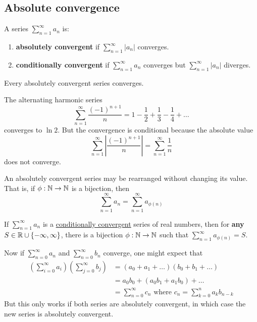 \documentclass[12pt]{article}
\begin{document}
\subsection{Absolute convergence}

 A series $\sum_{n=1}^{\infty}a_n$ is:\begin{enumerate}
    \item \textbf{absolutely convergent} if $\sum_{n=1}^{\infty}|a_n|$ converges.
    \item \textbf{conditionally convergent} if $\sum_{n=1}^{\infty}a_n$ converges but $\sum_{n=1}^{\infty}|a_n|$ diverges.
\end{enumerate}

\begin{theorem}
    Every absolutely convergent series converges.
\end{theorem}
\eg The alternating harmonic series $$\sum_{n=1}^{\infty}\frac{(-1)^{n+1}}{n}=1-\frac{1}{2}+\frac{1}{3}-\frac{1}{4}+\dots$$ converges to $\ln 2$. But the convergence is conditional because the absolute value $$\sum_{n=1}^{\infty}\left|\frac{(-1)^{n+1}}{n}\right|=\sum_{n=1}^{\infty}\frac{1}{n}$$ does not converge.

\begin{theorem}
    An absolutely convergent series may be rearranged without changing its value. That is, if $\phi:\mathbb{N}\to \mathbb{N}$ is a bijection, then $$\sum_{n=1}^{\infty}a_n=\sum_{n=1}^{\infty}a_{\phi(n)}$$
\end{theorem}

\begin{theorem}
    If $\sum_{n=1}^{\infty}a_n$ is a \uline{conditionally convergent} series of real numbers, then for \textbf{any} $S\in \mathbb{R}\cup \{-\infty,\infty\}$, there is a bijection $\phi:\mathbb{N}\to\mathbb{N}$ such that $\sum_{n=1}^{\infty}a_{\phi(n)}=S$.
\end{theorem}

\spl

Now if $\sum_{n=0}^{\infty}a_n$ and $\sum_{n=0}^{\infty}b_n$ converge, one might expect that \begin{align*}
    \left(\sum_{i=0}^{\infty}a_i\right)\left(\sum_{j=0}^{\infty}b_j\right)&=(a_0+a_1+\dots)(b_0+b_1+\dots)\\
    &= a_0b_0+(a_0b_1+a_1b_0)+\dots\\
    &= \sum_{n=0}^{\infty}c_n \text{ where } c_n=\sum_{k=0}^{n}a_kb_{n-k}
\end{align*}
But this only works if both series are absolutely convergent, in which case the new series is absolutely convergent.
\end{document}
